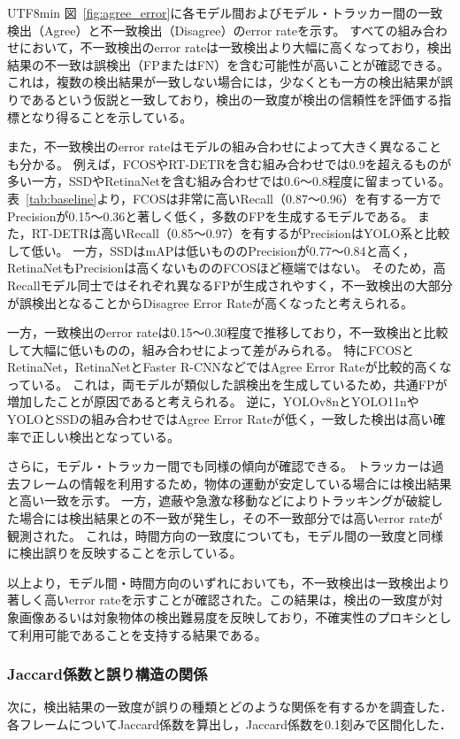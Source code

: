 \documentclass[conference, dvipdfmx]{IEEEtran}
\begin{document}
\begin{CJK}{UTF8}{min}
図~\ref{fig:agree_error}に各モデル間およびモデル・トラッカー間の一致検出（Agree）と不一致検出（Disagree）のerror rateを示す。
すべての組み合わせにおいて，不一致検出のerror rateは一致検出より大幅に高くなっており，検出結果の不一致は誤検出（FPまたはFN）を含む可能性が高いことが確認できる。
これは，複数の検出結果が一致しない場合には，少なくとも一方の検出結果が誤りであるという仮説と一致しており，検出の一致度が検出の信頼性を評価する指標となり得ることを示している。

また，不一致検出のerror rateはモデルの組み合わせによって大きく異なることも分かる。
例えば，FCOSやRT-DETRを含む組み合わせでは0.9を超えるものが多い一方，SSDやRetinaNetを含む組み合わせでは0.6～0.8程度に留まっている。
表~\ref{tab:baseline}より，FCOSは非常に高いRecall（0.87～0.96）を有する一方でPrecisionが0.15～0.36と著しく低く，多数のFPを生成するモデルである。
また，RT-DETRは高いRecall（0.85～0.97）を有するがPrecisionはYOLO系と比較して低い。
一方，SSDはmAPは低いもののPrecisionが0.77～0.84と高く，RetinaNetもPrecisionは高くないもののFCOSほど極端ではない。
そのため，高Recallモデル同士ではそれぞれ異なるFPが生成されやすく，不一致検出の大部分が誤検出となることからDisagree Error Rateが高くなったと考えられる。

一方，一致検出のerror rateは0.15～0.30程度で推移しており，不一致検出と比較して大幅に低いものの，組み合わせによって差がみられる。
特にFCOSとRetinaNet，RetinaNetとFaster R-CNNなどではAgree Error Rateが比較的高くなっている。
これは，両モデルが類似した誤検出を生成しているため，共通FPが増加したことが原因であると考えられる。
逆に，YOLOv8nとYOLO11nやYOLOとSSDの組み合わせではAgree Error Rateが低く，一致した検出は高い確率で正しい検出となっている。

さらに，モデル・トラッカー間でも同様の傾向が確認できる。
トラッカーは過去フレームの情報を利用するため，物体の運動が安定している場合には検出結果と高い一致を示す。
一方，遮蔽や急激な移動などによりトラッキングが破綻した場合には検出結果との不一致が発生し，その不一致部分では高いerror rateが観測された。
これは，時間方向の一致度についても，モデル間の一致度と同様に検出誤りを反映することを示している。

以上より，モデル間・時間方向のいずれにおいても，不一致検出は一致検出より著しく高いerror rateを示すことが確認された。この結果は，検出の一致度が対象画像あるいは対象物体の検出難易度を反映しており，不確実性のプロキシとして利用可能であることを支持する結果である。

\subsubsection{Jaccard係数と誤り構造の関係}
次に，検出結果の一致度が誤りの種類とどのような関係を有するかを調査した．
各フレームについてJaccard係数を算出し，Jaccard係数を0.1刻みで区間化した．


\end{CJK}
\end{document}
